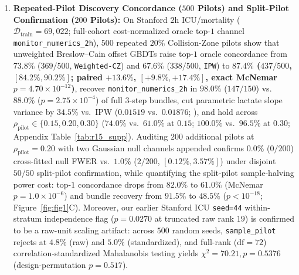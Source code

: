 \documentclass[11pt]{article}
\theoremstyle{remark}
\begin{document}
\begin{enumerate}
  \item \textbf{Repeated-Pilot Discovery Concordance ($500$ Pilots) and Split-Pilot Confirmation ($200$ Pilots):} On Stanford $2\text{h}$ ICU/mortality ($\mathcal{D}_{\text{train}}=69{,}022$; full-cohort cost-normalized oracle top-$1$ channel \texttt{monitor\_numerics\_2h}), $500$ repeated $20\%$ Collision-Zone pilots show that unweighted Breslow--Cain offset GBDTs raise top-$1$ oracle concordance from $73.8\%$ ($369/500$, \texttt{Weighted-CZ}) and $67.6\%$ ($338/500$, \texttt{IPW}) to \textbf{$87.4\%$ ($437/500$, $[84.2\%, 90.2\%]$; paired $+13.6\%$, $[+9.8\%, +17.4\%]$, exact McNemar $p=4.70\times 10^{-12}$)}, recover \texttt{monitor\_numerics\_2h} in $98.0\%$ ($147/150$) vs.\ $88.0\%$ ($p=2.75\times 10^{-4}$) of full $3$-step bundles, cut parametric lactate slope variance by $34.5\%$ vs.\ IPW ($0.01519$ vs.\ $0.01876$; \citealp{tao2017efficient}), and hold across $\rho_{\text{pilot}} \in \{0.15, 0.20, 0.30\}$ ($74.0\%$ vs.\ $61.0\%$ at $0.15$; $100.0\%$ vs.\ $96.5\%$ at $0.30$; Appendix Table~\ref{tab:r15_supp}). Auditing $200$ additional pilots at $\rho_{\text{pilot}}=0.20$ with two Gaussian null channels appended confirms $0.0\%$ ($0/200$) cross-fitted null FWER vs.\ $1.0\%$ ($2/200$, $[0.12\%, 3.57\%]$) under disjoint $50/50$ split-pilot confirmation, while quantifying the split-pilot sample-halving power cost: top-$1$ concordance drops from $82.0\%$ to $61.0\%$ (McNemar $p=1.0\times 10^{-6}$) and bundle recovery from $91.5\%$ to $48.5\%$ ($p < 10^{-18}$; Figure~\ref{fig:fig1}C). Moreover, our earlier Stanford ICU \texttt{seed=44} within-stratum independence flag ($p=0.0270$ at truncated raw rank $19$) is confirmed to be a raw-unit scaling artifact: across $500$ random seeds, \texttt{sample\_pilot} rejects at $4.8\%$ (raw) and $5.0\%$ (standardized), and full-rank ($\text{df}=72$) correlation-standardized Mahalanobis testing yields $\chi^2=70.21, p=0.5376$ (design-permutation $p=0.517$).

\end{enumerate}
\end{document}
